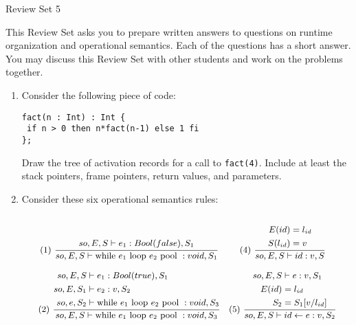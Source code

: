 \documentclass[12pt]{article} \usepackage{color} \usepackage{amsmath} \usepackage{amssymb}
\begin{document}
\begin{center}
{\large Review Set 5} 
\end{center}


This Review Set asks you to prepare written answers to questions on
runtime organization and operational semantics. Each of the questions has a
short answer. You may discuss this Review Set with other students and
work on the problems together. 

\begin{enumerate}
\item{Consider the following piece of code:
\begin{lstlisting}
fact(n : Int) : Int {
 if n > 0 then n*fact(n-1) else 1 fi
};
\end{lstlisting}
Draw the tree of activation records for a call to \texttt{fact(4)}. Include
at least the stack pointers, frame pointers, return values, and parameters. 
}
\item{
Consider these six operational semantics rules:
\begin{equation*}
\small
\begin{array}{cc}
(1) \ \cfrac{
\begin{aligned}
\\
\\
so, E, S \vdash e_1 : Bool(false), S_1
\end{aligned}
}
{so, E, S \vdash \text{while }e_1\text{ loop } e_2 \text{ pool } : void, S_1} 
&
(4) \ \cfrac{
\begin{aligned}
E(id) &= l_{id} \\
S(l_{id}) &= v
\end{aligned}
}{so, E, S \vdash id : v, S}
\\
\\
(2) \ \cfrac{
\begin{aligned}
so, E, S & \vdash e_1 : Bool(true), S_1 \\
so, E, S_1 & \vdash e_2 : v, S_2 \\
so, e, S_2 & \vdash \text{while } e_1 \text{ loop } e_2 \text{ pool } : void, S_3
\end{aligned}
}
{so, E, S \vdash \text{while }e_1\text{ loop } e_2 \text{ pool } : void, S_3} 
& 
(5) \ 
\cfrac{
\begin{aligned}
so, E, S & \vdash e : v, S_1 \\
E(id) &= l_{id} \\
S_2 & = S_1[v/l_{id}]
\end{aligned}
}
{so, E, S \vdash id \leftarrow e : v, S_2}


\end{array}
\end{equation*}}
\end{enumerate}
\end{document}
